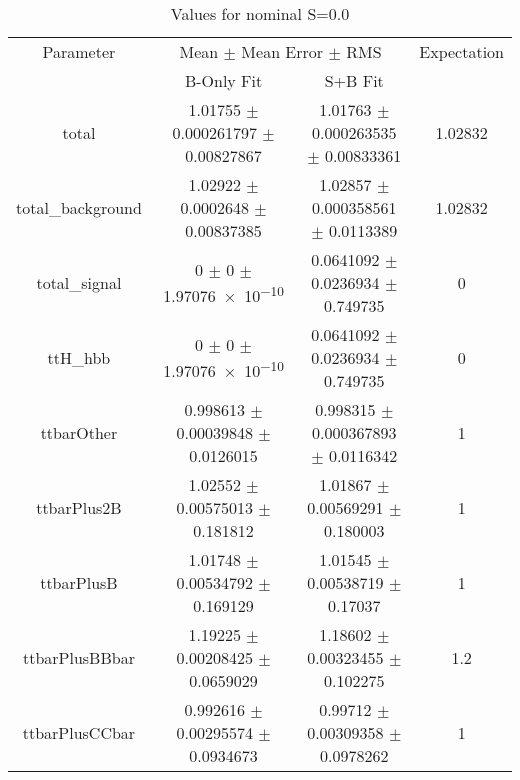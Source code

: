 \begin{table}
\centering
\caption{Values for nominal S=0.0}
\begin{tabular}{cccc}
\toprule
Parameter & \multicolumn{2}{c}{Mean $\pm$ Mean Error $\pm$ RMS} & Expectation\\
 & B-Only Fit & S+B Fit & \\
\midrule
total & \num{1.01755} $\pm$ \num{0.000261797} $\pm$ \num{0.00827867} & \num{1.01763} $\pm$ \num{0.000263535} $\pm$ \num{0.00833361} & \num{1.02832}\\
total\_background & \num{1.02922} $\pm$ \num{0.0002648} $\pm$ \num{0.00837385} & \num{1.02857} $\pm$ \num{0.000358561} $\pm$ \num{0.0113389} & \num{1.02832}\\
total\_signal & \num{0} $\pm$ \num{0} $\pm$ \num{1.97076e-10} & \num{0.0641092} $\pm$ \num{0.0236934} $\pm$ \num{0.749735} & \num{0}\\
ttH\_hbb & \num{0} $\pm$ \num{0} $\pm$ \num{1.97076e-10} & \num{0.0641092} $\pm$ \num{0.0236934} $\pm$ \num{0.749735} & \num{0}\\
ttbarOther & \num{0.998613} $\pm$ \num{0.00039848} $\pm$ \num{0.0126015} & \num{0.998315} $\pm$ \num{0.000367893} $\pm$ \num{0.0116342} & \num{1}\\
ttbarPlus2B & \num{1.02552} $\pm$ \num{0.00575013} $\pm$ \num{0.181812} & \num{1.01867} $\pm$ \num{0.00569291} $\pm$ \num{0.180003} & \num{1}\\
ttbarPlusB & \num{1.01748} $\pm$ \num{0.00534792} $\pm$ \num{0.169129} & \num{1.01545} $\pm$ \num{0.00538719} $\pm$ \num{0.17037} & \num{1}\\
ttbarPlusBBbar & \num{1.19225} $\pm$ \num{0.00208425} $\pm$ \num{0.0659029} & \num{1.18602} $\pm$ \num{0.00323455} $\pm$ \num{0.102275} & \num{1.2}\\
ttbarPlusCCbar & \num{0.992616} $\pm$ \num{0.00295574} $\pm$ \num{0.0934673} & \num{0.99712} $\pm$ \num{0.00309358} $\pm$ \num{0.0978262} & \num{1}\\
\bottomrule
\end{tabular}
\end{table}